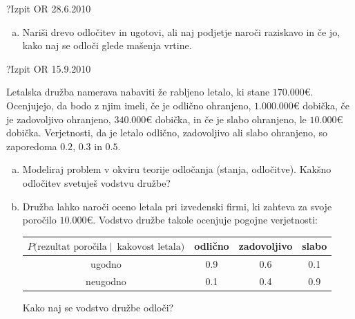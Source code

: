 \begin{naloga}{?}{Izpit OR 28.6.2010}
\begin{vprasanje}[bp]
\begin{enumerate}[(a)]
\item Nariši drevo odločitev in ugotovi,
ali naj podjetje naroči raziskavo in če jo,
kako naj se odloči glede mašenja vrtine.
\end{enumerate}
\end{vprasanje}
\begin{odgovor}
\end{odgovor}
\end{naloga}


\begin{naloga}{?}{Izpit OR 15.9.2010}
\begin{vprasanje}
Letalska družba namerava nabaviti že rabljeno letalo, ki stane $170.000 €$.
Ocenjujejo, da bodo z njim imeli,
če je odlično ohranjeno, $1.000.000 €$ dobička,
če je zadovoljivo ohranjeno, $340.000 €$ dobička,
in če je slabo ohranjeno, le $10.000 €$ dobička.
Verjetnosti, da je letalo odlično, zadovoljivo ali slabo ohranjeno,
so zaporedoma $0.2$, $0.3$ in $0.5$.
\begin{enumerate}[(a)]
\item Modeliraj problem v okviru teorije odločanja (stanja, odločitve).
Kakšno odločitev svetuješ vodstvu družbe?

\item Družba lahko naroči oceno letala pri izvedenski firmi,
ki zahteva za svoje poročilo $10.000 €$.
Vodstvo družbe takole ocenjuje pogojne verjetnosti:
\begin{center}
\begin{tabular}{c|ccc}
$P(\text{rezultat poročila} \;|\;\ \text{kakovost letala)}$
& odlično & zadovoljivo & slabo \\ \hline
ugodno & 0.9 & 0.6 & 0.1 \\
neugodno & 0.1 & 0.4 & 0.9
\end{tabular}
\end{center}
Kako naj se vodstvo družbe odloči?
\end{enumerate}

\end{vprasanje}
\begin{odgovor}
\end{odgovor}
\end{naloga}


